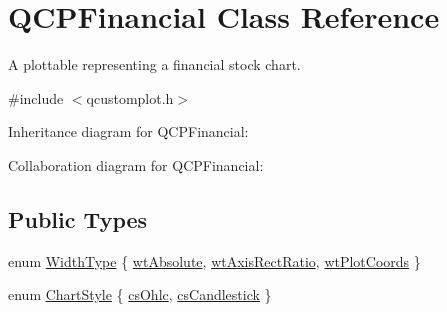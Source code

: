 \hypertarget{class_q_c_p_financial}{}\section{Q\+C\+P\+Financial Class Reference}
\label{class_q_c_p_financial}


A plottable representing a financial stock chart.  




{\ttfamily \#include $<$qcustomplot.\+h$>$}



Inheritance diagram for Q\+C\+P\+Financial\+:


Collaboration diagram for Q\+C\+P\+Financial\+:
\subsection*{Public Types}
\begin{DoxyCompactItemize}
\item 
enum \hyperlink{class_q_c_p_financial_aef1761dda71a53dc5269685e9e492626}{Width\+Type} \{ \hyperlink{class_q_c_p_financial_aef1761dda71a53dc5269685e9e492626a0758d53bb6d7b4858e6bf8771edc934a}{wt\+Absolute}, 
\hyperlink{class_q_c_p_financial_aef1761dda71a53dc5269685e9e492626a806518350ea5814d28c29b0056e33ecd}{wt\+Axis\+Rect\+Ratio}, 
\hyperlink{class_q_c_p_financial_aef1761dda71a53dc5269685e9e492626af676bc8dbe700b96b333329c9dbfc30f}{wt\+Plot\+Coords}
 \}
\item 
enum \hyperlink{class_q_c_p_financial_a0f800e21ee98d646dfc6f8f89d10ebfb}{Chart\+Style} \{ \hyperlink{class_q_c_p_financial_a0f800e21ee98d646dfc6f8f89d10ebfba3a516016c9298d3e95dd82aa203c4390}{cs\+Ohlc}, 
\hyperlink{class_q_c_p_financial_a0f800e21ee98d646dfc6f8f89d10ebfbac803cbd39f26e3f206bcc7028679e62f}{cs\+Candlestick}
 \}
\end{DoxyCompactItemize}
